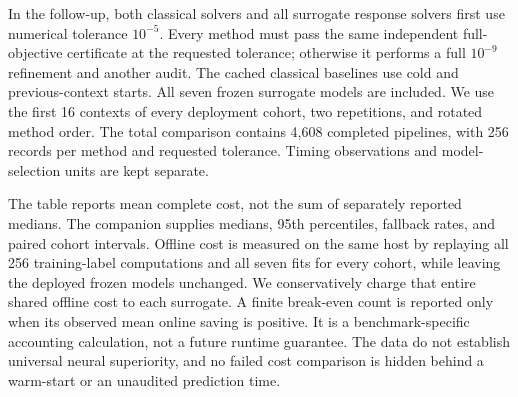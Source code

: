 In the follow-up, both classical solvers and all surrogate response solvers first use numerical tolerance $10^{-5}$. Every method must pass the same independent full-objective certificate at the requested tolerance; otherwise it performs a full $10^{-9}$ refinement and another audit. The cached classical baselines use cold and previous-context starts. All seven frozen surrogate models are included. We use the first 16 contexts of every deployment cohort, two repetitions, and rotated method order. The total comparison contains 4,608 completed pipelines, with 256 records per method and requested tolerance. Timing observations and model-selection units are kept separate.


The table reports mean complete cost, not the sum of separately reported medians. The companion supplies medians, 95th percentiles, fallback rates, and paired cohort intervals. Offline cost is measured on the same host by replaying all 256 training-label computations and all seven fits for every cohort, while leaving the deployed frozen models unchanged. We conservatively charge that entire shared offline cost to each surrogate. A finite break-even count is reported only when its observed mean online saving is positive. It is a benchmark-specific accounting calculation, not a future runtime guarantee. The data do not establish universal neural superiority, and no failed cost comparison is hidden behind a warm-start or an unaudited prediction time.
